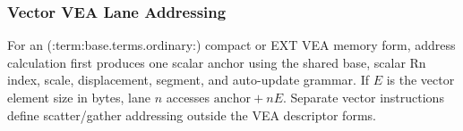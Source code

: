 \subsubsection{Vector VEA Lane Addressing}
For an (:term:base.terms.ordinary:) compact or EXT VEA memory form, address calculation first produces one scalar anchor using the
shared base, scalar Rn index, scale, displacement, segment, and auto-update grammar. If $E$ is the vector element
size in bytes, lane $n$ accesses \(\mathrm{anchor} + nE\). Separate vector instructions define scatter/gather addressing outside the
VEA descriptor forms.

\clearpage
